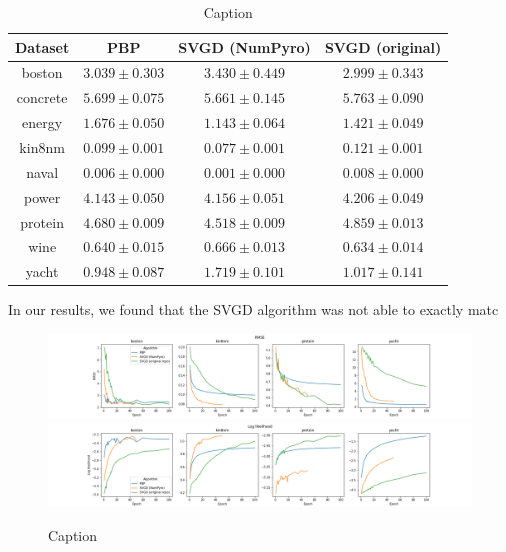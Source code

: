 \begin{table}[]
    \centering
\begin{tabular}{|c|ccc|}
\hline
 Dataset & PBP & SVGD (NumPyro) & SVGD (original)  \\
 \hline
boston & $3.039 \pm 0.303$ & $3.430 \pm 0.449$ & $2.999 \pm 0.343$ \\
concrete & $5.699 \pm 0.075$ & $5.661 \pm 0.145$ & $5.763 \pm 0.090$ \\
energy & $1.676 \pm 0.050$ & $1.143 \pm 0.064$ & $1.421 \pm 0.049$ \\
kin8nm & $0.099 \pm 0.001$ & $0.077 \pm 0.001$ & $0.121 \pm 0.001$ \\
naval & $0.006 \pm 0.000$ & $0.001 \pm 0.000$ & $0.008 \pm 0.000$ \\
power & $4.143 \pm 0.050$ & $4.156 \pm 0.051$ & $4.206 \pm 0.049$ \\
protein & $4.680 \pm 0.009$ & $4.518 \pm 0.009$ & $4.859 \pm 0.013$ \\
wine & $0.640 \pm 0.015$ & $0.666 \pm 0.013$ & $0.634 \pm 0.014$ \\
yacht & $0.948 \pm 0.087$ & $1.719 \pm 0.101$ & $1.017 \pm 0.141$ \\
\hline
\end{tabular}
    \caption{Caption}
    \label{tab:my_label}
\end{table}

In our results, we found that the SVGD algorithm was not able to exactly matc

\begin{figure}[h]
    \centering
    \includegraphics[width=\textwidth]{figs/bayesian_epoch_RMSE.png}
    \includegraphics[width=\textwidth]{figs/bayesian_epoch_Loglikelihood.png}
    \caption{Caption}
    \label{fig:my_label}
\end{figure}